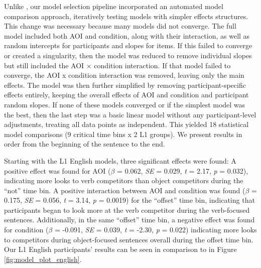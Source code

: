 Unlike \textcite{ge2021a}, our model selection pipeline incorporated an automated model comparison approach, iteratively testing models with simpler effects structures. This change was necessary because many models did not converge. The full model included both AOI and condition, along with their interaction, as well as random intercepts for participants and slopes for items. If this failed to converge or created a singularity, then the model was reduced to remove individual slopes but still included the AOI × condition interaction. If that model failed to converge, the AOI x condition interaction was removed, leaving only the main effects. The model was then further simplified by removing participant-specific effects entirely, keeping the overall effects of AOI and condition and participant random slopes. If none of these models converged or if the simplest model was the best, then the last step was a basic linear model without any participant-level adjustments, treating all data points as independent. This yielded 18 statistical model comparisons (9 critical time bins x 2 L1 groups). We present results in order from the beginning of the sentence to the end. 

Starting with the L1 English models, three significant effects were found: A positive effect was found for AOI ($\beta$ = 0.062, \textit{SE} = 0.029, \textit{t} = 2.17, \textit{p} = 0.032), indicating more looks to verb competitors than object competitors during the “not” time bin. A positive interaction between AOI and condition was found ($\beta$ = 0.175, \textit{SE} = 0.056, \textit{t} = 3.14, \textit{p} = 0.0019) for the “offset” time bin, indicating that participants began to look more at the verb competitor during the verb-focused sentences. Additionally, in the same “offset” time bin, a negative effect was found for condition ($\beta$ = -0.091, \textit{SE} = 0.039, \textit{t} = -2.30, \textit{p} = 0.022) indicating more looks to competitors during object-focused sentences overall during the offset time bin. Our L1 English participants' results can be seen in comparison to \textcite{ge2021a} in Figure \ref{fig:model_plot_english}.

